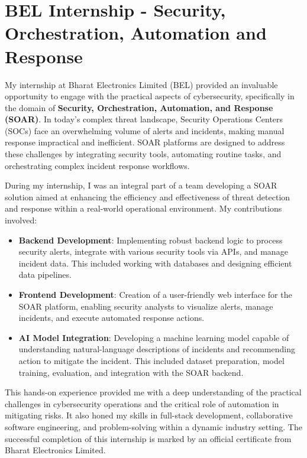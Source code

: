 \section{BEL Internship - Security, Orchestration, Automation and Response}
My internship at Bharat Electronics Limited (BEL) provided an invaluable opportunity to engage with the practical aspects of cybersecurity, specifically in the domain of \textbf{Security, Orchestration, Automation, and Response (SOAR)}. In today's complex threat landscape, Security Operations Centers (SOCs) face an overwhelming volume of alerts and incidents, making manual response impractical and inefficient. SOAR platforms are designed to address these challenges by integrating security tools, automating routine tasks, and orchestrating complex incident response workflows.

During my internship, I was an integral part of a team developing a SOAR solution aimed at enhancing the efficiency and effectiveness of threat detection and response within a real-world operational environment. My contributions involved:
\begin{itemize}
    \item \textbf{Backend Development}: Implementing robust backend logic to process security alerts, integrate with various security tools via APIs, and manage incident data. This included working with databases and designing efficient data pipelines.
    \item \textbf{Frontend Development}: Creation of a user-friendly web interface for the SOAR platform, enabling security analysts to visualize alerts, manage incidents, and execute automated response actions.
    \item \textbf{AI Model Integration}: Developing a machine learning model capable of understanding natural-language descriptions of incidents and recommending action to mitigate the incident. This included dataset preparation, model training, evaluation, and integration with the SOAR backend.
\end{itemize}
This hands-on experience provided me with a deep understanding of the practical challenges in cybersecurity operations and the critical role of automation in mitigating risks. It also honed my skills in full-stack development, collaborative software engineering, and problem-solving within a dynamic industry setting. The successful completion of this internship is marked by an official certificate from Bharat Electronics Limited.